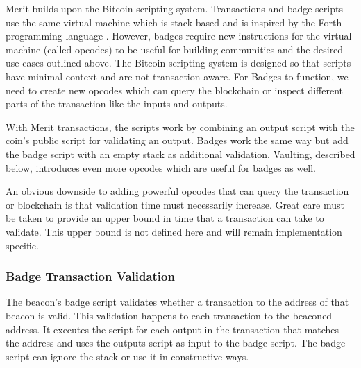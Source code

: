 \documentclass{article}
\begin{document}
Merit builds upon the Bitcoin scripting system. Transactions and badge scripts use
the same virtual machine which is stack based and is inspired by the Forth programming
language \cite{scripts}. However, badges require new instructions for the virtual
machine (called opcodes) to be useful for building communities and the desired
use cases outlined above. The Bitcoin scripting system is designed so that scripts
have minimal context and are not transaction aware. For Badges to function, we
need to create new opcodes which can query the blockchain or inspect different
parts of the transaction like the inputs and outputs.

\begin{center}
\end{center}

With Merit transactions, the scripts work by combining an output script with the
coin's public script for validating an output. Badges work the same way but add
the badge script with an empty stack as additional validation. Vaulting, described
below, introduces even more opcodes which are useful for badges as well.

An obvious downside to adding powerful opcodes that can query the transaction or
blockchain is that validation time must necessarily increase. Great care must
be taken to provide an upper bound in time that a transaction can take to validate.
This upper bound is not defined here and will remain implementation specific. 

\subsubsection{Badge Transaction Validation}

The beacon's badge script validates whether a transaction to the address of that
beacon is valid. This validation happens to each transaction to the beaconed address.
It executes the script for each output in the transaction that matches the address
and uses the outputs script as input to the badge script. The badge script can
ignore the stack or use it in constructive ways.
\end{document}
